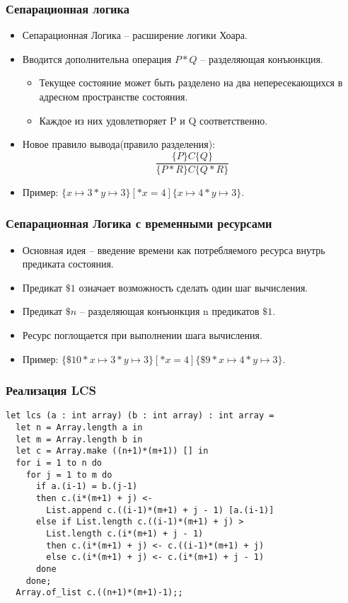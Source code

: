 \documentclass{beamer}
\begin{document}
\begin{frame}
	\frametitle{Сепарационная логика}
	\begin{itemize}
		\item<2-> Сепарационная Логика \cite{SepLogic} -- расширение логики Хоара.
		\item<3-> Вводится дополнительна операция $P \ast Q$ -- разделяющая конъюнкция.
		      \begin{itemize}
			      \item<4-> Текущее состояние может быть разделено на два непересекающихся в адресном пространстве состояния.
			      \item<5-> Каждое из них удовлетворяет P и Q соответственно.
		      \end{itemize}
		\item<6-> Новое правило вывода(правило разделения):
		      $$
			      \frac{\{P\} C\{Q\}}{\{P * R\} C\{Q * R\}}
		      $$
		\item<7-> Пример: $\{x \mapsto 3 \ast y \mapsto 3\}[*x = 4]\{x \mapsto 4 \ast y \mapsto 3\}$.
	\end{itemize}
\end{frame}

\begin{frame}
	\frametitle{Сепарационная Логика с временными ресурсами}
	\begin{itemize}
		\item<2-> Основная идея \cite{SepLogicTime} -- введение времени как потребляемого ресурса внутрь предиката состояния.
		\item<3-> Предикат $\$1$ означает возможность сделать один шаг вычисления.
		\item<4-> Предикат $\$n$ -- разделяющая конъюнкция n предикатов $\$1$.
		\item<5-> Ресурс поглощается при выполнении шага вычисления.
		\item<6-> Пример: $\{\$10 \ast x \mapsto 3 \ast y \mapsto 3\}[*x = 4]\{\$9 \ast x \mapsto 4 \ast y \mapsto 3\}$.
	\end{itemize}
\end{frame}

\begin{frame}[fragile]
	\frametitle{Реализация LCS}
	\begin{verbatim}
let lcs (a : int array) (b : int array) : int array =
  let n = Array.length a in
  let m = Array.length b in
  let c = Array.make ((n+1)*(m+1)) [] in
  for i = 1 to n do
    for j = 1 to m do
      if a.(i-1) = b.(j-1)
      then c.(i*(m+1) + j) <- 
      	List.append c.((i-1)*(m+1) + j - 1) [a.(i-1)]
      else if List.length c.((i-1)*(m+1) + j) > 
      	List.length c.(i*(m+1) + j - 1)
        then c.(i*(m+1) + j) <- c.((i-1)*(m+1) + j)
        else c.(i*(m+1) + j) <- c.(i*(m+1) + j - 1)
      done
    done; 
  Array.of_list c.((n+1)*(m+1)-1);;
	\end{verbatim}
\end{frame}
\end{document}
